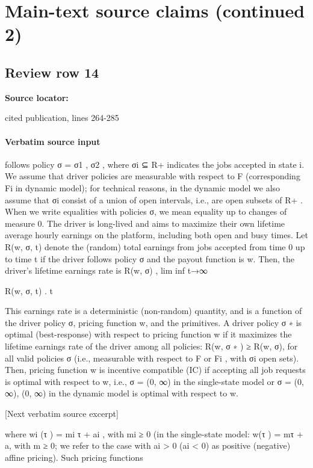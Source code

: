 \documentclass[10pt]{article}
\begin{document}
\section*{Main-text source claims (continued 2)}
\subsection*{Review row 14}
\textbf{Source locator:} {\footnotesize\raggedright cited publication, lines 264-\allowbreak{}285\par}
\paragraph{Verbatim source input}
\begin{ReviewVerbatim}
follows policy σ = {σ1 , σ2 }, where σi ⊆ R+ indicates the jobs accepted in state i. We assume that
driver policies are measurable with respect to F (corresponding Fi in dynamic model); for technical
reasons, in the dynamic model we also assume that σi consist of a union of open intervals, i.e., are
open subsets of R+ . When we write equalities with policies σ, we mean equality up to changes of
measure 0.
The driver is long-lived and aims to maximize their own lifetime average hourly earnings on the
platform, including both open and busy times. Let R(w, σ, t) denote the (random) total earnings
from jobs accepted from time 0 up to time t if the driver follows policy σ and the payout function
is w. Then, the driver’s lifetime earnings rate is
R(w, σ) , lim inf t→∞

R(w, σ, t)
.
t

This earnings rate is a deterministic (non-random) quantity, and is a function of the driver policy
σ, pricing function w, and the primitives.
A driver policy σ ∗ is optimal (best-response) with respect to pricing function w if it maximizes
the lifetime earnings rate of the driver among all policies: R(w, σ ∗ ) ≥ R(w, σ), for all valid policies
σ (i.e., measurable with respect to F or Fi , with σi open sets). Then, pricing function w is incentive
compatible (IC) if accepting all job requests is optimal with respect to w, i.e., σ = (0, ∞) in
the single-state model or σ = {(0, ∞), (0, ∞)} in the dynamic model is optimal with respect to w.

[Next verbatim source excerpt]

where wi (τ ) = mi τ + ai , with mi ≥ 0 (in the single-state model: w(τ ) = mτ + a, with m ≥ 0; we
refer to the case with ai > 0 (ai < 0) as positive (negative) affine pricing). Such pricing functions


\end{ReviewVerbatim}
\end{document}
